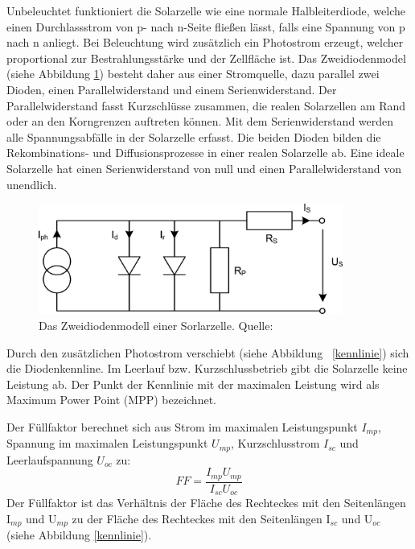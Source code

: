 \documentclass[a4paper,bibtotoc,oneside]{scrbook}
\begin{document}
Unbeleuchtet funktioniert die Solarzelle wie eine normale Halbleiterdiode, welche einen Durchlassstrom von p- nach n-Seite fließen lässt, falls eine Spannung von p nach n anliegt. Bei Beleuchtung wird zusätzlich ein Photostrom erzeugt, welcher proportional zur Bestrahlungsstärke und der Zellfläche ist. Das Zweidiodenmodel (siehe Abbildung \ref{esb}) besteht daher aus einer Stromquelle, dazu parallel zwei Dioden, einen Parallelwiderstand und einem Serienwiderstand. Der Parallelwiderstand fasst Kurzschlüsse zusammen, die realen Solarzellen am Rand oder an den Korngrenzen auftreten können. Mit dem Serienwiderstand werden alle Spannungsabfälle in der Solarzelle erfasst. Die beiden Dioden bilden die Rekombinations- und Diffusionsprozesse in einer realen Solarzelle ab. Eine ideale Solarzelle hat einen Serienwiderstand von null und einen Parallelwiderstand von unendlich. 
\begin{figure}[htbp]
\centering
\includegraphics[width=100mm]{img/esb2.png}
\caption{Das Zweidiodenmodell einer Sorlarzelle. Quelle: \cite{pv}}\label{esb}
\end{figure}

Durch den zusätzlichen Photostrom verschiebt (siehe Abbildung ~\ref{kennlinie}) sich die Diodenkennline. Im Leerlauf  bzw. Kurzschlussbetrieb gibt die Solarzelle keine Leistung ab. Der Punkt der Kennlinie mit der maximalen Leistung wird als Maximum Power Point (MPP) bezeichnet.

Der Füllfaktor berechnet sich aus Strom im maximalen Leistungspunkt $I_{mp}$, Spannung im maximalen Leistungspunkt $U_{mp}$, Kurzschlusstrom $I_{sc}$ und Leerlaufspannung $U_{oc}$ zu:
  \begin{equation}
     FF = \frac {I_{mp} U_{mp}} {I_{sc} U_{oc}}
  \end{equation}
Der Füllfaktor ist das Verhältnis der Fläche des Rechteckes mit den Seitenlängen I$_{mp}$ und U$_{mp}$ zu der Fläche des Rechteckes mit den Seitenlängen I$_{sc}$ und U$_{oc}$ (siehe Abbildung \ref{kennlinie}).
\end{document}
